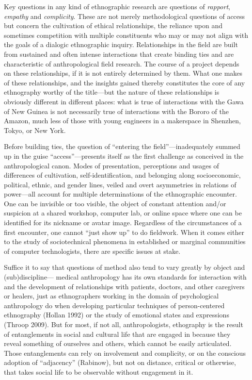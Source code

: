 \documentclass[10pt,letter,oneside]{scrartcl}
\begin{document}
Key questions in any kind of ethnographic research are questions of
\emph{rapport}, \emph{empathy} and \emph{complicity}.  These are not
merely methodological questions of access but concern the cultivation
of ethical relationships, the reliance upon and sometimes competition
with multiple constituents who may or may not align with the goals of 
a dialogic ethnographic inquiry. Relationships in the field are built 
from sustained and often intense interactions that create binding ties 
and are characteristic of anthropological field research. The course of 
a project depends on these relationships, if it is not entirely 
determined by them.  What one makes of these relationships, and the 
insights gained thereby constitutes the core of any ethnography worthy 
of the title---but the nature of these relationships is obviously different 
in different places:  what is true of interactions with the Gawa of New 
Guinea is not necessarily true of interactions with the Bororo of the 
Amazon, much less of those with young engineers in a makerspace 
in Shenzhen, Tokyo, or New York.

Before building ties, the question of ``entering the field''---inadequately 
summed up in the guise ``access''---presents itself as the first challenge 
as conceived in the anthropological canon.  Modes of presentation, perceptions 
and usages of differences of cultivation, self-identification, and belonging 
along socioeconomic, political, ethnic, and gender lines, veiled and overt 
asymmetries in relations of power---all account for multiple determinations of 
the ethnographic encounter. One can be invisible or too visible, the object 
of constant attention and/or suspicion at a shared workshop, computer lab, or
online space where one can be identified for its nickname or avatar image.  
Regardless of the circumstances of a first encounter, one cannot ``just show up'' 
to do fieldwork.  When it comes either to the study of sociotechnical phenomena 
in established or marginal communities of computer technologists, there are 
specific issues at stake.
  
Suffice it to say that questions of method also tend to vary greatly by object 
and (sub)discipline--- medical anthropology has its own standards for
interaction with and the development of relationships with patients,
doctors, and other caregivers or healers, just as ethnographers working in
the domain of psychological anthropology do when developing particular
techniques of person-centered ethnography (Hollan 1992) or the study of 
emotional states and expressions (Throop 2009). But for most, if not all,
anthropologists, ethography is the result of entanglements in social and 
cultural life that are engaged in because they reveal something of ourselves 
and others, which cannot be easily articulated. Those entanglements can rely 
on involvement and complicity, or on the conscious adoption of ``adjacency'' 
(Rabinow), but not on distance, critical or otherwise, that takes social life to 
be observable without engagement in it.
\end{document}
